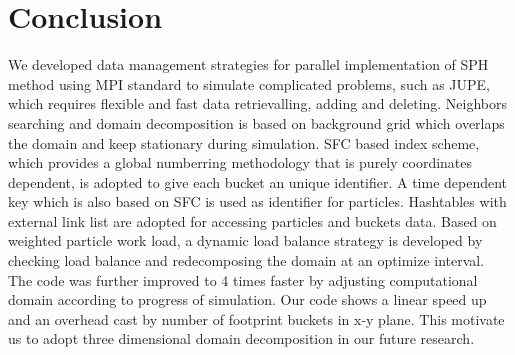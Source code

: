 \documentclass[10pt,a4paper]{article}
\begin{document}
\section{Conclusion}
We developed data management strategies for parallel implementation of SPH method using MPI standard to simulate complicated problems, such as JUPE, which requires flexible and fast data retrievalling, adding and deleting. Neighbors searching and domain decomposition is based on background grid which overlaps the domain and keep stationary during simulation. SFC based index scheme, which provides a global numberring methodology that is purely coordinates dependent, is adopted to give each bucket an unique identifier. A time dependent key which is also based on SFC is used as identifier for particles. 
Hashtables with external link list are adopted for accessing  particles and buckets data. Based on weighted particle work load, a dynamic load balance strategy is developed by checking load balance and redecomposing the domain at an optimize interval. The code was further improved to 4 times faster by adjusting computational domain according to progress of simulation. 
Our code shows a linear speed up and an overhead cast by number of footprint buckets in x-y plane. This motivate us to adopt three dimensional domain decomposition in our future research.



\end{document}
